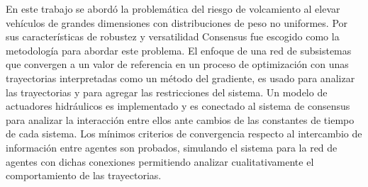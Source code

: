 En este trabajo se abordó la problemática del riesgo de volcamiento al elevar vehículos de grandes dimensiones con distribuciones de peso no uniformes. Por sus características de robustez y versatilidad Consensus fue escogido como la metodología para abordar este problema. El enfoque de una red de subsistemas que convergen a un valor de referencia en un proceso de optimización  con unas trayectorias interpretadas como un método del gradiente, es usado para analizar las trayectorias y para agregar las restricciones del sistema. 
Un modelo de actuadores hidráulicos es implementado y es conectado al sistema de consensus para analizar la interacción entre ellos ante cambios de las constantes de tiempo de cada sistema.
Los mínimos criterios de convergencia respecto al intercambio de información entre agentes son probados, simulando el sistema para la red de agentes con dichas conexiones permitiendo analizar cualitativamente el comportamiento de las trayectorias.